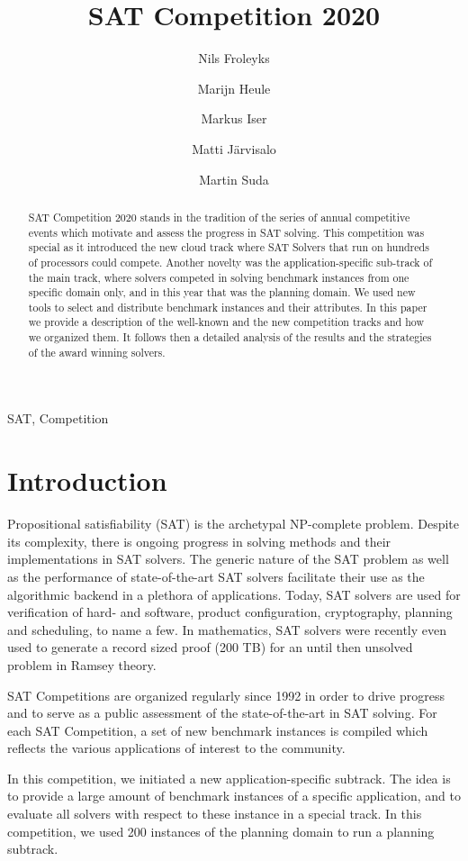 \documentclass{elsarticle}
\title{SAT Competition 2020\tnoteref{title}}
\author[jku]{Nils Froleyks}
\author[cmu]{Marijn Heule}
\author[kit]{Markus Iser}
\author[hiit]{Matti Järvisalo}
\author[ctu]{Martin Suda}
\begin{document}
\begin{abstract}
SAT Competition 2020 stands in the tradition of the series of annual competitive events which motivate and assess the progress in SAT solving. 
This competition was special as it introduced the new cloud track where SAT Solvers that run on hundreds of processors could compete. 
Another novelty was the application-specific sub-track of the main track, 
where solvers competed in solving benchmark instances from one specific domain only, and in this year that was the planning domain. 
We used new tools to select and distribute benchmark instances and their attributes. 
In this paper we provide a description of the well-known and the new competition tracks and how we organized them. 
It follows then a detailed analysis of the results and the strategies of the award winning solvers. 
\end{abstract}

\begin{keyword}
SAT, Competition
\end{keyword}

\maketitle

\section{Introduction}

Propositional satisfiability (SAT) is the archetypal NP-complete problem. 
Despite its complexity, there is ongoing progress in solving methods and their implementations in SAT solvers. 
The generic nature of the SAT problem as well as the performance of state-of-the-art SAT solvers facilitate their use as the algorithmic backend in a plethora of applications. 
Today, SAT solvers are used for verification of hard- and software, product configuration, cryptography, planning and scheduling, to name a few. 
In mathematics, SAT solvers were recently even used to generate a record sized proof (200 TB) for an until then unsolved problem in Ramsey theory. 

SAT Competitions are organized regularly since 1992 in order to drive progress and to serve as a public assessment of the state-of-the-art in SAT solving. 
For each SAT Competition, a set of new benchmark instances is compiled which reflects the various applications of interest to the community. 

In this competition, we initiated a new application-specific subtrack. 
The idea is to provide a large amount of benchmark instances of a specific application, and to evaluate all solvers with respect to these instance in a special track. 
In this competition, we used 200 instances of the planning domain to run a planning subtrack. 
\end{document}

